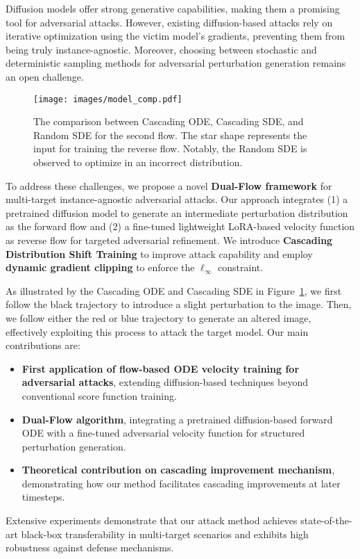 Diffusion models \cite{ho2020denoising, song2020denoising, rombach2022high} offer strong generative capabilities, making them a promising tool for adversarial attacks. However, existing diffusion-based attacks rely on iterative optimization using the victim model’s gradients, preventing them from being truly instance-agnostic. Moreover, choosing between stochastic and deterministic sampling methods for adversarial perturbation generation remains an open challenge.
\begin{figure}[ht]
\vskip 0.2in
\begin{center}
\centerline{\texttt{[image: images/model\_comp.pdf]}}
\caption{The comparison between Cascading ODE, Cascading SDE, and Random SDE for the second flow. The star shape represents the input for training the reverse flow. Notably, the Random SDE is observed to optimize in an incorrect distribution.}

\label{fig:model_comp}
\end{center}
\vskip -0.2in
\end{figure}
To address these challenges, we propose a novel \textbf{Dual-Flow framework} for multi-target instance-agnostic adversarial attacks. Our approach integrates (1) a pretrained diffusion model to generate an intermediate perturbation distribution as the forward flow and (2) a fine-tuned lightweight LoRA-based velocity function as reverse flow for targeted adversarial refinement. We introduce \textbf{Cascading Distribution Shift Training} to improve attack capability and employ \textbf{dynamic gradient clipping} to enforce the $\ell_\infty$ constraint. 

As illustrated by the Cascading ODE and Cascading SDE in Figure~\ref{fig:model_comp}, we first follow the black trajectory to introduce a slight perturbation to the image. Then, we follow either the red or blue trajectory to generate an altered image, effectively exploiting this process to attack the target model.
Our main contributions are:
\begin{itemize}[leftmargin=*]
    \item \textbf{First application of flow-based ODE velocity training for adversarial attacks}, extending diffusion-based techniques beyond conventional score function training.
    \item \textbf{Dual-Flow algorithm}, integrating a pretrained diffusion-based forward ODE with a fine-tuned adversarial velocity function for structured perturbation generation.
 \item \textbf{Theoretical contribution on cascading improvement mechanism}, demonstrating how our method facilitates cascading improvements at later timesteps.
\end{itemize}
Extensive experiments demonstrate that our attack method achieves state-of-the-art black-box transferability in multi-target scenarios and exhibits high robustness against defense mechanisms.